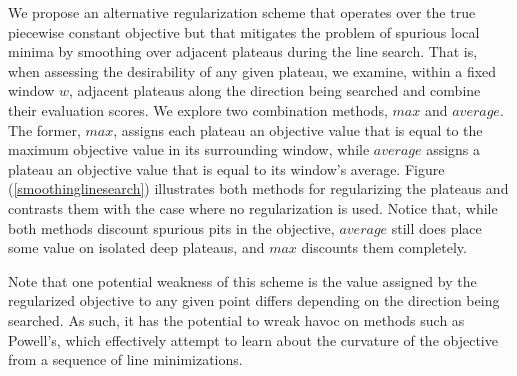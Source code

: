 \documentclass[11pt]{article}
\begin{document}
We propose an alternative regularization scheme that operates over the true piecewise constant objective but that mitigates the problem of spurious local minima by smoothing over adjacent plateaus during the line search. That is, when assessing the desirability of any given plateau, we examine, within a fixed window \mbox{$w$}, adjacent plateaus along the direction being searched and combine their evaluation scores. We explore two combination methods, \mbox{$max$} and \mbox{$average$}. The former, \mbox{$max$}, assigns each plateau an objective value that is equal to the maximum objective value in its surrounding window, while \mbox{$average$} assigns a plateau an objective value that is equal to its window's average. Figure (\ref{smoothinglinesearch}) illustrates both methods for regularizing the plateaus and contrasts them with the case where no regularization is used. Notice that, while both methods discount spurious pits in the objective, \mbox{$average$} still does place some value on isolated deep plateaus, and \mbox{$max$} discounts them completely.

Note that one potential weakness of this scheme is the value assigned by the regularized objective to any given point differs depending on the direction being searched. As such, it has the potential to wreak havoc on methods such as Powell's, which effectively attempt to learn about the curvature of the objective from a sequence of line minimizations. 



\end{document}

